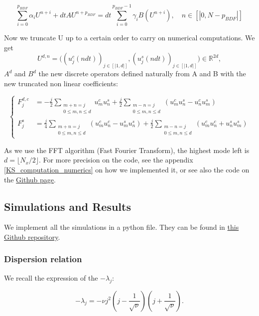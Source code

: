 \documentclass[12pt]{article}
\begin{document}
\begin{equation}
    \boxed{
    \sum_{i=0}^{p_{BDF}} \alpha_i U^{n+i} + dtAU^{n+p_{BDF}} = dt\sum_{i=0}^{p_{BDF}-1} \gamma_iB(U^{n+i}), \quad n\in [|0, N-p_{BDF}|]
    }
\end{equation}

Now we truncate U up to a certain order to carry on numerical computations. We get $$U^{d, n} = \Big((u_j^c(ndt))_{j\in [|1,d|]}, (u_j^s(ndt))_{j\in [|1,d|]} \Big)\in \mathbb{R}^{2d},$$ 
$A^d$ and $B^d$ the new discrete operators defined naturally from A and B with the new truncated non linear coefficients:

\begin{equation}
\left\{
\begin{aligned}
    F_j^{d,c} &= -\frac{j}{2} \sum_{\substack{m+n=j \\ 0\leq m, n \leq d}}u_m^cu_n^s + \frac{j}{2} \sum_{\substack{m-n=j\\ 0\leq m, n \leq d}}(u_m^cu_n^s - u_n^cu_m^s) \\
    F_j^s &= \frac{j}{4} \sum_{\substack{m+n=j \\ 0\leq m, n \leq d}}(u_m^cu_n^c - u_m^su_n^s)+ \frac{j}{2} \sum_{\substack{m-n=j \\ 0\leq m, n \leq d}}(u_m^cu_n^c + u_n^su_m^s)    
\end{aligned}
\right.
\end{equation}


As we use the FFT algorithm (Fast Fourier Transform), the highest mode left is $d =\lfloor N_x/2 \rfloor.$ For more precision on the code, 
see the appendix \ref{KS_computation_numerics} on how we implemented it, or see also the code on the
 \href{https://github.com/Bilal59170/Repo_Warwick_internship}{Github page}. 

\subsection{Simulations and Results}
We implement all the simulations in a python file. They can be found in \href{https://github.com/Bilal59170/Repo_Warwick_internship}{this Github repository}.

\subsubsection{Dispersion relation}
We recall the expression of the $-\lambda_j:$

\begin{equation}
    -\lambda_j = -\nu j^2(j-\frac{1}{\sqrt{\nu}})(j+\frac{1}{\sqrt{\nu}}).
\end{equation}
\end{document}
